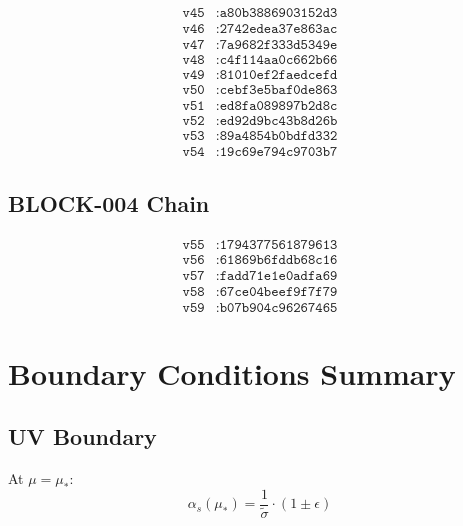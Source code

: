 \documentclass[11pt,a4paper]{article}
\theoremstyle{definition}
\begin{document}
\begin{align}
\label{eq:app-99}
\texttt{v45} &: \texttt{a80b3886903152d3} \\
\label{eq:app-100}
\texttt{v46} &: \texttt{2742edea37e863ac} \\
\label{eq:app-101}
\texttt{v47} &: \texttt{7a9682f333d5349e} \\
\label{eq:app-102}
\texttt{v48} &: \texttt{c4f114aa0c662b66} \\
\label{eq:app-103}
\texttt{v49} &: \texttt{81010ef2faedcefd} \\
\label{eq:app-104}
\texttt{v50} &: \texttt{cebf3e5baf0de863} \\
\label{eq:app-105}
\texttt{v51} &: \texttt{ed8fa089897b2d8c} \\
\label{eq:app-106}
\texttt{v52} &: \texttt{ed92d9bc43b8d26b} \\
\label{eq:app-107}
\texttt{v53} &: \texttt{89a4854b0bdfd332} \\
\label{eq:app-108}
\texttt{v54} &: \texttt{19c69e794c9703b7}
\end{align}

\subsection{BLOCK-004 Chain}
\label{subsec:app-hash-b004}

\begin{align}
\label{eq:app-109}
\texttt{v55} &: \texttt{1794377561879613} \\
\label{eq:app-110}
\texttt{v56} &: \texttt{61869b6fddb68c16} \\
\label{eq:app-111}
\texttt{v57} &: \texttt{fadd71e1e0adfa69} \\
\label{eq:app-112}
\texttt{v58} &: \texttt{67ce04beef9f7f79} \\
\label{eq:app-113}
\texttt{v59} &: \texttt{b07b904c96267465}
\end{align}

\section{Boundary Conditions Summary}
\label{app:boundary}

\subsection{UV Boundary}
\label{subsec:app-uv-bc}

At $\mu = \mu_*$:
\begin{equation}
\label{eq:app-114}
\alpha_s(\mu_*) = \frac{1}{\tilde{\sigma}} \cdot (1 \pm \epsilon)
\end{equation}
\end{document}
